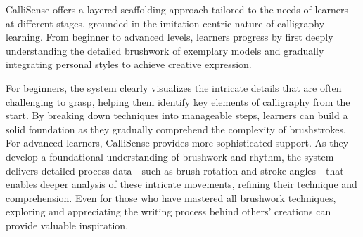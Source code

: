 




CalliSense offers a layered scaffolding approach tailored to the needs of learners at different stages, grounded in the imitation-centric nature of calligraphy learning. From beginner to advanced levels, learners progress by first deeply understanding the detailed brushwork of exemplary models and gradually integrating personal styles to achieve creative expression.

For beginners, the system clearly visualizes the intricate details that are often challenging to grasp, helping them identify key elements of calligraphy from the start. By breaking down techniques into manageable steps, learners can build a solid foundation as they gradually comprehend the complexity of brushstrokes. For advanced learners, CalliSense provides more sophisticated support. As they develop a foundational understanding of brushwork and rhythm, the system delivers detailed process data—such as brush rotation and stroke angles—that enables deeper analysis of these intricate movements, refining their technique and comprehension. Even for those who have mastered all brushwork techniques, exploring and appreciating the writing process behind others’ creations can provide valuable inspiration.

